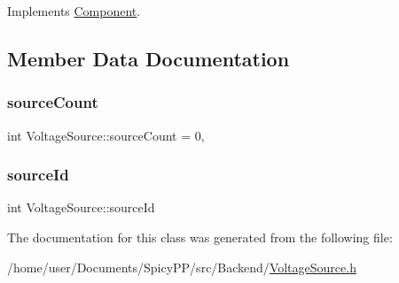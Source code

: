 Implements \hyperlink{classComponent_a7c6ba16177143bc9945583a9c3df4c89}{Component}.



\subsection{Member Data Documentation}
\mbox{\label{classVoltageSource_ade16a2431763eeff86ec7a4f842cf6f0}} 
\subsubsection{\texorpdfstring{source\+Count}{sourceCount}}
{\footnotesize\ttfamily int Voltage\+Source\+::source\+Count = 0\hspace{0.3cm}{\ttfamily [static]}, {\ttfamily [private]}}

\mbox{\label{classVoltageSource_a34411acea2cb7d017e1b5c0b826d69a6}} 
\subsubsection{\texorpdfstring{source\+Id}{sourceId}}
{\footnotesize\ttfamily int Voltage\+Source\+::source\+Id\hspace{0.3cm}{\ttfamily [private]}}



The documentation for this class was generated from the following file\+:\begin{DoxyCompactItemize}
\item 
/home/user/\+Documents/\+Spicy\+P\+P/src/\+Backend/\hyperlink{VoltageSource_8h}{Voltage\+Source.\+h}\end{DoxyCompactItemize}
